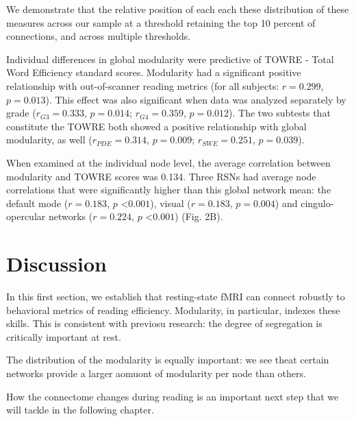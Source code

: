 We demonstrate that the relative position of each each these distribution of these measures across our sample at a threshold retaining the top 10 percent of connections, and across multiple thresholds. 

Individual differences in global modularity were predictive of TOWRE - Total Word Efficiency standard scores. Modularity had a significant positive relationship with out-of-scanner reading metrics (for all subjects: $r = 0.299$, $p = 0.013$). This effect was also significant when data was analyzed separately by grade ($r_{G3} = 0.333$, $p = 0.014$; $r_{G4} = 0.359$, $p = 0.012$). The two subtests that constitute the TOWRE both showed a positive relationship with global modularity, as well ($r_{PDE} = 0.314$, $p = 0.009$; $r_{SWE} = 0.251$, $p = 0.039$). 

When examined at the individual node level, the average correlation between modularity and TOWRE scores was 0.134. Three RSNs had average node correlations that were significantly higher than this global network mean: the default mode ($r = 0.183$, $p$ \textless $0.001$), visual ($r = 0.183$, $p = 0.004$) and cingulo-opercular networks ($r = 0.224$, $p$ \textless $0.001$) (Fig. 2B). 

\section{Discussion}

In this first section, we establish that resting-state fMRI can connect robustly to behavioral metrics of reading efficiency. Modularity, in particular, indexes these skills. This is consistent with previosu research: the degree of segregation is critically important at rest. 

The distribution of the modularity is equally important: we see theat certain networks provide a larger aomuont of modularity per node than others. 

How the connectome changes during reading is an important next step that we will tackle in the following chapter.
